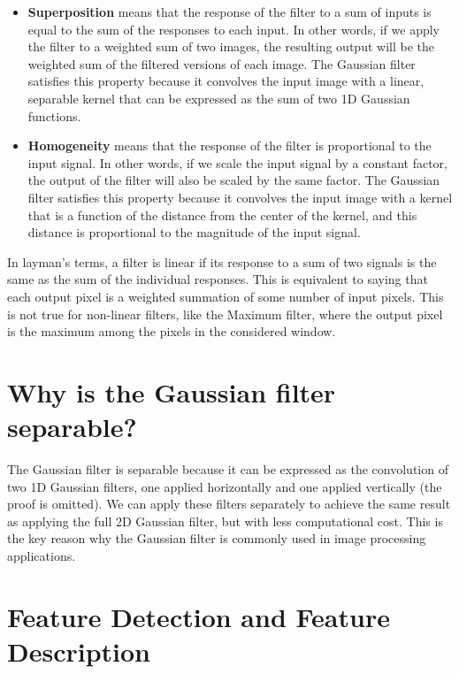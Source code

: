 \documentclass{article}
\begin{document}
\begin{itemize}
    \item \textbf{Superposition} means that the response of the filter to a sum of inputs is equal to the sum of the responses to each input. In other words, if we apply the filter to a weighted sum of two images, the resulting output will be the weighted sum of the filtered versions of each image. The Gaussian filter satisfies this property because it convolves the input image with a linear, separable kernel that can be expressed as the sum of two 1D Gaussian functions.
    \item \textbf{Homogeneity} means that the response of the filter is proportional to the input signal. In other words, if we scale the input signal by a constant factor, the output of the filter will also be scaled by the same factor. The Gaussian filter satisfies this property because it convolves the input image with a kernel that is a function of the distance from the center of the kernel, and this distance is proportional to the magnitude of the input signal.
\end{itemize}

In layman's terms, a filter is linear if its response to a sum of two signals is the same as the sum of the individual responses. This is equivalent to saying that each output pixel is a weighted summation of some number of input pixels. This is not true for non-linear filters, like the Maximum filter, where the output pixel is the maximum among the pixels in the considered window. 

\section*{Why is the Gaussian filter separable?}

The Gaussian filter is separable because it can be expressed as the convolution of two 1D Gaussian filters, one applied horizontally and one applied vertically (the proof is omitted). We can apply these filters separately to achieve the same result as applying the full 2D Gaussian filter, but with less computational cost. This is the key reason why the Gaussian filter is commonly used in image processing applications.

\newpage 

\section*{Feature Detection and Feature Description}
\end{document}
